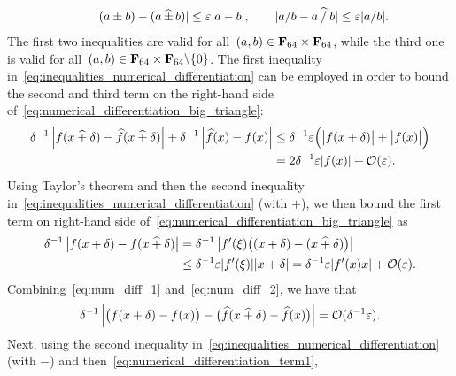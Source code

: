 \begin{solution}
\begin{align}
        \qquad \lvert (a\pm b) - (a \, \widehat \pm\, b) \rvert \leq \varepsilon \lvert a-b\rvert,
        \qquad \lvert a/b - a \mathbin{\widehat /} b\rvert \leq \varepsilon \lvert a/b \rvert.
    \end{align}
    The first two inequalities are valid for all~$(a, b) \in \mathbf F_{64} \times \mathbf F_{64}$,
    while the third one is valid for all~$(a, b) \in \mathbf F_{64} \times \mathbf F_{64} \backslash \{0\}$.
    The first inequality in~\eqref{eq:inequalities_numerical_differentiation}
    can be employed in order to bound the second and third term on the right-hand side of~\eqref{eq:numerical_differentiation_big_triangle}:
    \begin{align}
        \nonumber
        \delta^{-1}\left\lvert f(x \mathbin{\widehat +} \delta) - \widehat f(x \mathbin{\widehat +} \delta) \right\rvert
        + \delta^{-1} \left\lvert \widehat f(x) - f(x) \right\rvert
        \nonumber
        &\leq \delta^{-1} \varepsilon \Bigl( \bigl\lvert f(x + \delta) \bigr\rvert + \bigl\lvert f(x) \bigr\rvert  \Bigr) \\
        \label{eq:num_diff_1}
        &= 2 \delta^{-1} \varepsilon \lvert f(x)\rvert + \mathcal O(\varepsilon).
    \end{align}
    Using Taylor's theorem and then the second inequality in~\eqref{eq:inequalities_numerical_differentiation} (with $+$),
    we then bound the first term on right-hand side of~\eqref{eq:numerical_differentiation_big_triangle} as
    \begin{align}
        \nonumber
        \delta^{-1}\left\lvert f(x + \delta) - f(x \mathbin{\widehat +} \delta) \right\rvert
        &= \delta^{-1} \left\lvert f'(\xi) \bigl( (x + \delta) - (x \mathbin{\widehat +} \delta)  \bigr) \right\rvert \\
        \label{eq:num_diff_2}
        &\leq \delta^{-1} \varepsilon \lvert f'(\xi) \rvert \lvert x + \delta \rvert
        = \delta^{-1} \varepsilon \lvert f'(x) x \rvert  + \mathcal O(\varepsilon).
    \end{align}
    Combining~\eqref{eq:num_diff_1} and~\eqref{eq:num_diff_2},
    we have that
    \begin{equation}
        \label{eq:numerical_differentiation_term1}
        \delta^{-1}
        \left\lvert \bigl( f(x+ \delta) - f(x) \bigr)
        - \bigl(  \widehat f(x \mathbin{\widehat +} \delta) - \widehat f(x) \bigr) \right\rvert
        = \mathcal O(\delta^{-1} \varepsilon).
    \end{equation}
    Next, using the second inequality in~\eqref{eq:inequalities_numerical_differentiation} (with $-$) and
    then~\eqref{eq:numerical_differentiation_term1},

\end{solution}
